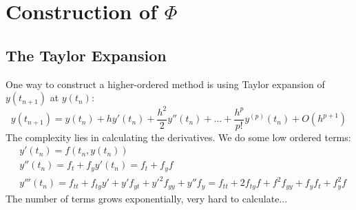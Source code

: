 \documentclass[a4paper, 11pt]{article}
\begin{document}
\section{Construction of $\Phi$}
\subsection{The Taylor Expansion}
One way to construct a higher-ordered method is using Taylor expansion of $y(t_{n+1})$ at $y(t_n)$:
$$
y(t_{n+1}) = y(t_n) + hy'(t_n) + \frac{h^2}{2}y''(t_n) + ... + \frac{h^p}{p!}y^{(p)}(t_n) + O(h^{p+1})
$$
The complexity lies in calculating the derivatives. We do some low ordered terms:
\begin{equation}
	\begin{split}
		& y'(t_n) = f(t_n, y(t_n)) \\
		& y''(t_n) = f_t + f_y y'(t_n) = f_t + f_yf\\
		& y'''(t_n) = f_{tt} + f_{ty}y' + y'f_{yt} + y'^2f_{yy} + y'' f_y = f_{tt} + 2f_{ty}f + f^2f_{yy} + f_{y}f_t + f_y^2f
	\end{split}
\end{equation}
The number of terms grows exponentially, very hard to calculate...
\end{document}
